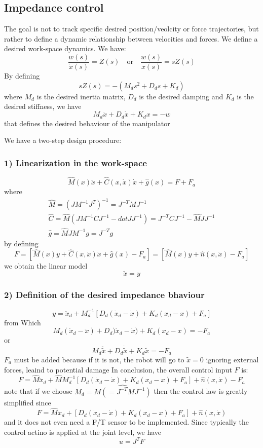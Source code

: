 \documentclass{book}
\begin{document}
\subsection{Impedance control}
The goal is not to track specific desired position/veolcity or force trajectories, but rather to define a dynamic relationship between velocities and forces. We define a desired work-space dynamics. We have:
\[
    \displaystyle\frac{w(s)}{\dot{x}(s)}=Z(s) \quad \text{or} \quad \displaystyle\frac{w(s)}{x(s)}=sZ(s)
\]
By defining
\[
    sZ(s)=-(M_ds^2+D_ds+K_d)
\]
where $M_d$ is the desired inertia matrix, $D_d$ is the desired damping and $K_d$ is the desired stiffness, we have
\[
    M_d\ddot{x}+D_d\dot{x}+K_dx=-w
\]
that defines the desired behaviour of the manipulator

We have a two-step design procedure:
\subsubsection{1) Linearization in the work-space}
\[
    \hat{M}(x)\ddot{x}+\hat{C}(x,\dot{x})\dot{x}+\hat{g}(x)=F+F_a
\]
where
\begin{gather*}
    \hat{M} = (JM^{-1}J^T)^{-1}=J^{-T}MJ^{-1}\\
    \hat{C} = \hat{M}(JM^{-1}CJ^{-1}-dot{J}J^{-1})=J^{-T}CJ^{-1}-\hat{M}\dot{J}J^{-1}\\
    \hat{g} = \hat{M}JM^{-1}g = J^{-T}g
\end{gather*}
by defining 
\[
    F = [\hat{M}(x)y+\hat{C}(x,\dot{x})\dot{x}+\hat{g}(x)-F_a] = [\hat{M}(x)y+\hat{n}(x,\dot{x})-F_a]
\]
we obtain the linear model 
\[
    \ddot{x}=y
\]
\subsubsection{2) Definition of the desired impedance bhaviour}
\[
    y=\ddot{x}_d+M_d^{-1}[D_d(\dot{x}_d-\dot{x})+K_d(x_d-x)+F_a]
\]
from Which
\[
    M_d(\dot{x}_d-\ddot{x})+D_d)\dot{x}_d-\dot{x})+K_d(x_d-x)=-F_a
\]
or 
\[
    M_d\ddot{\tilde{x}}+D_d\dot{\tilde{x}}+K_d\tilde{x}=-F_a
\]
$F_a$ must be added because if it is not, the robot will go to $\tilde{x}=0$ ignoring external forces, leaind to potential damage
In conclusion, the overall control input $F$ is:
\[
    F = \hat{M}\ddot{x}_d +\hat{M}M_d^{-1}[D_d(\dot{x}_d-\dot{x})+K_d(x_d-x)+F_a]+\hat{n}(x,\dot{x})-F_a
\]
note that if we choose $M_d=\hat{M (=J^{-T}MJ^{-1})}$ then the control law is greatly simplified since 
\[
    F = \hat{M}\ddot{x}_d+[D_d(\dot{x}_d-\dot{x})+K_d(x_d-x)+F_a]+\hat{n}(x,\dot{x})
\]
and it does not even need a F/T sensor to be implemented. Since typically the control actino is applied at the joint level, we have 
\[
    u=J^TF
\]
\end{document}
